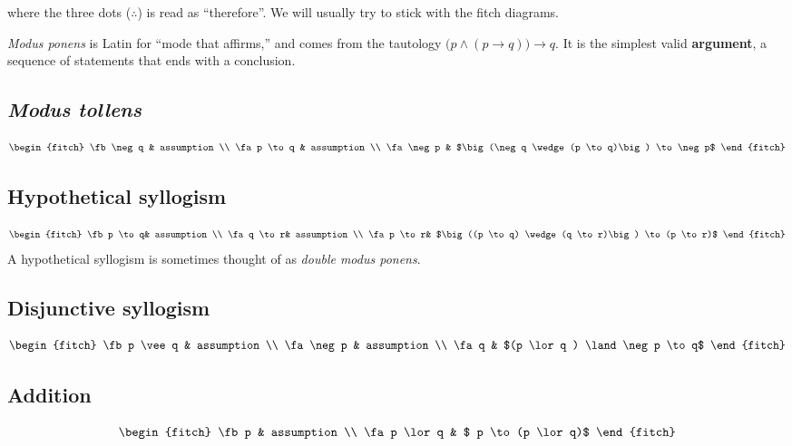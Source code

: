 where the three dots ($\therefore$) is read as ``therefore''.
We will usually try to stick with the fitch diagrams.

\emph{Modus ponens} is Latin for ``mode that affirms,'' and comes from the
tautology $\big(p \wedge (p \to q)\big) \to q$. It is the simplest valid
\textbf{argument}, a sequence of statements that ends with a conclusion.

\subsection{\emph{Modus tollens}}
\begin{equation*}
  \begin{fitch}
    \fb \neg q  & assumption \\
    \fa p \to q & assumption \\
    \fa \neg p & $\big(\neg q \wedge (p \to q)\big) \to \neg p$
  \end{fitch}
\end{equation*}

\subsection{Hypothetical syllogism}
\begin{equation*}
  \begin{fitch}
    \fb p \to q& assumption \\
    \fa q \to r& assumption \\
    \fa p \to r& $\big((p \to q) \wedge (q \to r)\big) \to (p \to r)$
  \end{fitch}
\end{equation*}
A hypothetical syllogism is sometimes thought of as \emph{double modus ponens}.

\subsection{Disjunctive syllogism}
\begin{equation*}
  \begin{fitch}
    \fb p \vee q & assumption \\
    \fa \neg p   & assumption \\
    \fa q & $(p \lor q ) \land \neg p \to q$
  \end{fitch}
\end{equation*}

\subsection{Addition}
\begin{equation*}
  \begin{fitch}
    \fb p & assumption \\
    \fa p \lor q & $ p \to (p \lor q)$
  \end{fitch}
\end{equation*}

